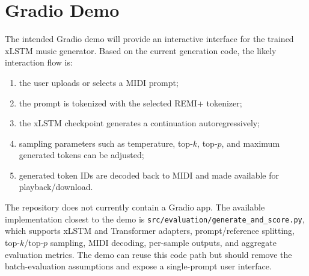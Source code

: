 \section{Gradio Demo}

The intended Gradio demo will provide an interactive interface for the trained xLSTM music generator. Based on the current generation code, the likely interaction flow is:
\begin{enumerate}
	\item the user uploads or selects a MIDI prompt;
	\item the prompt is tokenized with the selected REMI+ tokenizer;
	\item the xLSTM checkpoint generates a continuation autoregressively;
	\item sampling parameters such as temperature, top-\(k\), top-\(p\), and maximum generated tokens can be adjusted;
	\item generated token IDs are decoded back to MIDI and made available for playback/download.
\end{enumerate}

The repository does not currently contain a Gradio app. The available implementation closest to the demo is \verb|src/evaluation/generate_and_score.py|, which supports xLSTM and Transformer adapters, prompt/reference splitting, top-\(k\)/top-\(p\) sampling, MIDI decoding, per-sample outputs, and aggregate evaluation metrics. The demo can reuse this code path but should remove the batch-evaluation assumptions and expose a single-prompt user interface.


